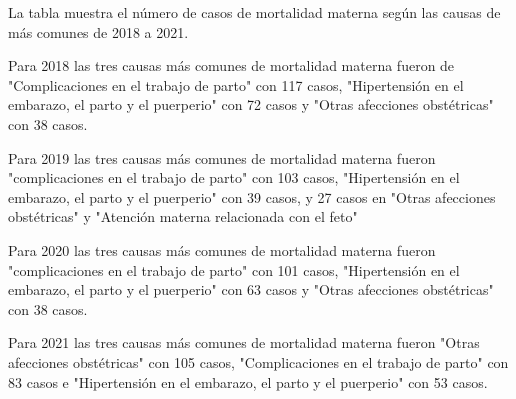 \justifying La tabla muestra el número de casos de mortalidad materna según las causas de más comunes de 2018 a 2021. 

Para 2018 las tres causas más comunes de mortalidad materna fueron de  "Complicaciones en el trabajo de parto" con 117 casos, "Hipertensión en el embarazo, el parto y el puerperio" con 72 casos y "Otras afecciones obstétricas" con 38 casos. 

Para 2019 las tres causas más comunes de mortalidad materna fueron "complicaciones en el trabajo de parto" con 103 casos, "Hipertensión en el embarazo, el parto y el puerperio" con 39 casos, y 27 casos en "Otras afecciones obstétricas" y "Atención materna relacionada con el feto"

Para 2020 las tres causas más comunes de mortalidad materna fueron "complicaciones en el trabajo de parto" con 101 casos, "Hipertensión en el embarazo, el parto y el puerperio" con 63 casos y "Otras afecciones obstétricas" con 38 casos. 

Para 2021 las tres causas más comunes de mortalidad materna fueron "Otras afecciones obstétricas" con 105 casos, "Complicaciones en el trabajo de parto" con 83 casos e "Hipertensión en el embarazo, el parto y el puerperio" con 53 casos.